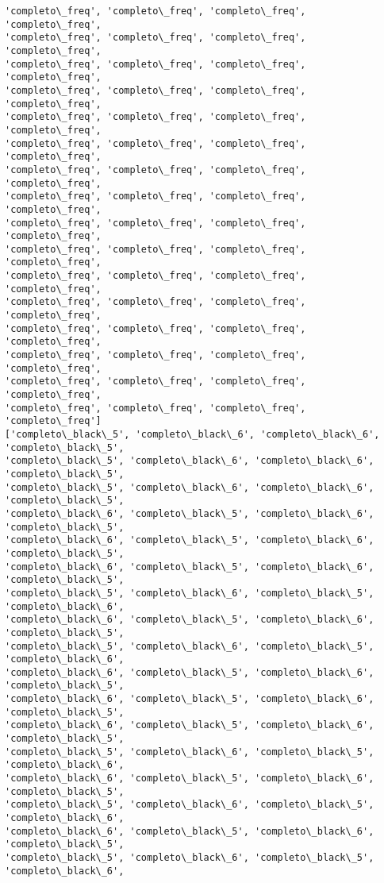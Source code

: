 \documentclass[11pt]{article}
\begin{document}
\begin{Verbatim}[commandchars=\\\{\}]
'completo\_freq', 'completo\_freq', 'completo\_freq', 'completo\_freq',
'completo\_freq', 'completo\_freq', 'completo\_freq', 'completo\_freq',
'completo\_freq', 'completo\_freq', 'completo\_freq', 'completo\_freq',
'completo\_freq', 'completo\_freq', 'completo\_freq', 'completo\_freq',
'completo\_freq', 'completo\_freq', 'completo\_freq', 'completo\_freq',
'completo\_freq', 'completo\_freq', 'completo\_freq', 'completo\_freq',
'completo\_freq', 'completo\_freq', 'completo\_freq', 'completo\_freq',
'completo\_freq', 'completo\_freq', 'completo\_freq', 'completo\_freq',
'completo\_freq', 'completo\_freq', 'completo\_freq', 'completo\_freq',
'completo\_freq', 'completo\_freq', 'completo\_freq', 'completo\_freq',
'completo\_freq', 'completo\_freq', 'completo\_freq', 'completo\_freq',
'completo\_freq', 'completo\_freq', 'completo\_freq', 'completo\_freq',
'completo\_freq', 'completo\_freq', 'completo\_freq', 'completo\_freq',
'completo\_freq', 'completo\_freq', 'completo\_freq', 'completo\_freq',
'completo\_freq', 'completo\_freq', 'completo\_freq', 'completo\_freq',
'completo\_freq', 'completo\_freq', 'completo\_freq', 'completo\_freq']
['completo\_black\_5', 'completo\_black\_6', 'completo\_black\_6', 'completo\_black\_5',
'completo\_black\_5', 'completo\_black\_6', 'completo\_black\_6', 'completo\_black\_5',
'completo\_black\_5', 'completo\_black\_6', 'completo\_black\_6', 'completo\_black\_5',
'completo\_black\_6', 'completo\_black\_5', 'completo\_black\_6', 'completo\_black\_5',
'completo\_black\_6', 'completo\_black\_5', 'completo\_black\_6', 'completo\_black\_5',
'completo\_black\_6', 'completo\_black\_5', 'completo\_black\_6', 'completo\_black\_5',
'completo\_black\_5', 'completo\_black\_6', 'completo\_black\_5', 'completo\_black\_6',
'completo\_black\_6', 'completo\_black\_5', 'completo\_black\_6', 'completo\_black\_5',
'completo\_black\_5', 'completo\_black\_6', 'completo\_black\_5', 'completo\_black\_6',
'completo\_black\_6', 'completo\_black\_5', 'completo\_black\_6', 'completo\_black\_5',
'completo\_black\_6', 'completo\_black\_5', 'completo\_black\_6', 'completo\_black\_5',
'completo\_black\_6', 'completo\_black\_5', 'completo\_black\_6', 'completo\_black\_5',
'completo\_black\_5', 'completo\_black\_6', 'completo\_black\_5', 'completo\_black\_6',
'completo\_black\_6', 'completo\_black\_5', 'completo\_black\_6', 'completo\_black\_5',
'completo\_black\_5', 'completo\_black\_6', 'completo\_black\_5', 'completo\_black\_6',
'completo\_black\_6', 'completo\_black\_5', 'completo\_black\_6', 'completo\_black\_5',
'completo\_black\_5', 'completo\_black\_6', 'completo\_black\_5', 'completo\_black\_6',

\end{Verbatim}
\end{document}
